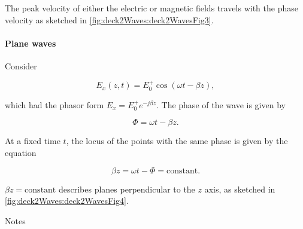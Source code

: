 The peak velocity of either the electric or magnetic fields travels with the phase velocity as sketched in \cref{fig:deck2Waves:deck2WavesFig3}.


\paragraph{Plane waves}

Consider

\begin{equation}\label{eqn:uwavesLecture2:1040}
E_x(z, t) = E_0^{+} \cos(\omega t - \beta z),
\end{equation}

which had the phasor form \( E_x = E_0^{+} e^{-j \beta z} \).  The phase of the wave is given by

\begin{equation}\label{eqn:uwavesLecture2:1060}
\Phi = \omega t - \beta z.
\end{equation}

At a fixed time \( t \), the locus of the points with the same phase is given by the equation

\begin{equation}\label{eqn:uwavesLecture2:1080}
\beta z = \omega t - \Phi = \textrm{constant}.
\end{equation}

\( \beta z = \textrm{constant} \) describes planes perpendicular to the \( z \) axis, as sketched in \cref{fig:deck2Waves:deck2WavesFig4}.


Notes

